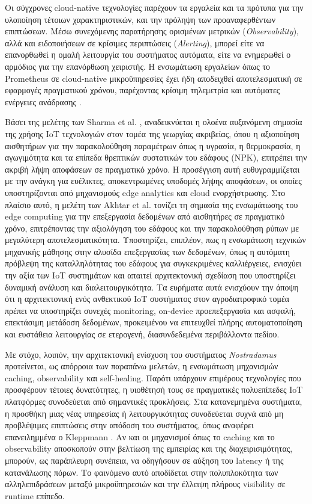 Οι σύγχρονες cloud-native τεχνολογίες παρέχουν τα εργαλεία και τα πρότυπα για την υλοποίηση τέτοιων χαρακτηριστικών, και την πρόληψη των προαναφερθέντων επιπτώσεων. Μέσω συνεχόμενης παρατήρησης ορισμένων μετρικών (\textit{Observability}), αλλά και ειδοποιήσεων σε κρίσιμες περιπτώσεις (\textit{Alerting}), μπορεί είτε να επανορθωθεί η ομαλή λειτουργία του συστήματος αυτόματα, είτε να ενημερωθεί ο αρμόδιος για την επανόρθωση χειριστής. Η ενσωμάτωση εργαλείων όπως το Prometheus σε cloud-native μικροϋπηρεσίες έχει ήδη αποδειχθεί αποτελεσματική σε εφαρμογές πραγματικού χρόνου, παρέχοντας κρίσιμη τηλεμετρία και αυτόματες ενέργειες ανάδρασης \cite{iotmonitoring}.

Βάσει της μελέτης των Sharma et al. \cite{iotagriculture}, αναδεικνύεται η ολοένα αυξανόμενη σημασία της χρήσης IoT τεχνολογιών στον τομέα της γεωργίας ακριβείας, όπου η αξιοποίηση αισθητήρων για την παρακολούθηση παραμέτρων όπως η υγρασία, η θερμοκρασία, η αγωγιμότητα και τα επίπεδα θρεπτικών συστατικών του εδάφους (NPK), επιτρέπει την ακριβή λήψη αποφάσεων σε πραγματικό χρόνο. Η προσέγγιση αυτή ευθυγραμμίζεται με την ανάγκη για ευέλικτες, αποκεντρωμένες υποδομές λήψης αποφάσεων, οι οποίες υποστηρίζονται από μηχανισμούς edge analytics και cloud ενορχήστρωσης. Στο πλαίσιο αυτό, η μελέτη των Akhtar et al. \cite{edgeagriculture} τονίζει τη σημασία της ενσωμάτωσης του edge computing για την επεξεργασία δεδομένων από αισθητήρες σε πραγματικό χρόνο, επιτρέποντας την αξιολόγηση του εδάφους και την παρακολούθηση ρύπων με μεγαλύτερη αποτελεσματικότητα. Υποστηρίζει, επιπλέον, πως η ενσωμάτωση τεχνικών μηχανικής μάθησης στην αλυσίδα επεξεργασίας των δεδομένων, όπως η αυτόματη πρόβλεψη της καταλληλότητας του εδάφους για συγκεκριμένες καλλιέργειες, ενισχύει την αξία των IoT συστημάτων και απαιτεί αρχιτεκτονική σχεδίαση που υποστηρίζει δυναμική ανάλυση και διαλειτουργικότητα. Τα ευρήματα αυτά ενισχύουν την άποψη ότι η αρχιτεκτονική ενός ανθεκτικού IoT συστήματος στον αγροδιατροφικό τομέα πρέπει να υποστηρίζει συνεχές monitoring, on-device προεπεξεργασία και ασφαλή, επεκτάσιμη μετάδοση δεδομένων, προκειμένου να επιτευχθεί πλήρης αυτοματοποίηση και ευστάθεια λειτουργίας σε ετερογενή, διασυνδεδεμένα περιβάλλοντα πεδίου.

Με στόχο, λοιπόν, την αρχιτεκτονική ενίσχυση του συστήματος \textit{Nostradamus} προτείνεται, ως απόρροια των παραπάνω μελετών, η ενσωμάτωση μηχανισμών caching, observability και self-healing. Παρότι υπάρχουν επιμέρους τεχνολογίες που προσφέρουν τέτοιες δυνατότητες, η υιοθέτησή τους σε πραγματικές πολυεπίπεδες IoT πλατφόρμες συνοδεύεται από σημαντικές προκλήσεις. Στα κατανεμημένα συστήματα, η προσθήκη μιας νέας υπηρεσίας ή λειτουργικότητας συνοδεύεται συχνά από μη προβλέψιμες επιπτώσεις στην απόδοση του συστήματος, όπως αναφέρει επανειλημμένα ο Kleppmann \cite{kleppmanndda}. Αν και οι μηχανισμοί όπως το caching και το observability αποσκοπούν στην βελτίωση της εμπειρίας και της διαχειρισιμότητας, μπορούν, ως παράπλευρη συνέπεια, να οδηγήσουν σε αύξηση του latency ή της κατανάλωσης πόρων. Το φαινόμενο αυτό αποδίδεται στην πολυπλοκότητα των αλληλεπιδράσεων μεταξύ μικροϋπηρεσιών και την έλλειψη πλήρους visibility σε runtime επίπεδο.

